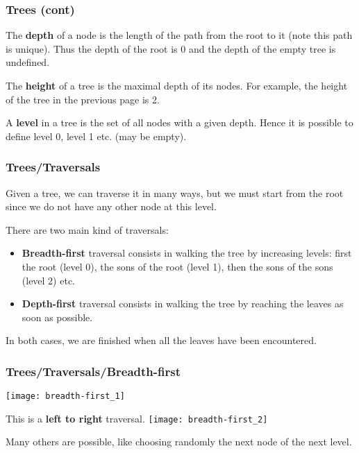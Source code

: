 %
\begin{frame}
\frametitle{Trees (cont)}

The \textbf{depth} of a node is the length of the path from the root
to it (note this path is unique). Thus the depth of the root is 0 and
the depth of the empty tree is undefined.

\bigskip

The \textbf{height} of a tree is the maximal depth of its nodes. For
example, the height of the tree in the previous page is 2.

\bigskip

A \textbf{level} in a tree is the set of all nodes with a given
depth. Hence it is possible to define level 0, level 1 etc. (may be
empty).

\end{frame}

%
\begin{frame}
\frametitle{Trees/Traversals}

Given a tree, we can traverse it in many ways, but we must start from
the root since we do not have any other node at this level.

\bigskip

There are two main kind of traversals:
\begin{itemize}

  \item \textbf{Breadth-first} traversal consists in walking the
  tree by increasing levels: first the root (level 0), the sons of the
  root (level 1), then the sons of the sons (level 2) etc. 

  \item \textbf{Depth-first} traversal consists in walking the tree 
  by reaching the leaves as soon as possible.

\end{itemize}
In both cases, we are finished when all the leaves have been encountered.

\end{frame}

%
\begin{frame}
\frametitle{Trees/Traversals/Breadth-first}

\label{breadth_first_pictures}

\begin{multicols}{2}
\texttt{[image: breadth-first\_1]}

This is a \textbf{left to right} traversal.
\vfill\columnbreak
\texttt{[image: breadth-first\_2]}
\end{multicols}
Many others are possible, like choosing randomly the next node of the
next level.

\end{frame}

